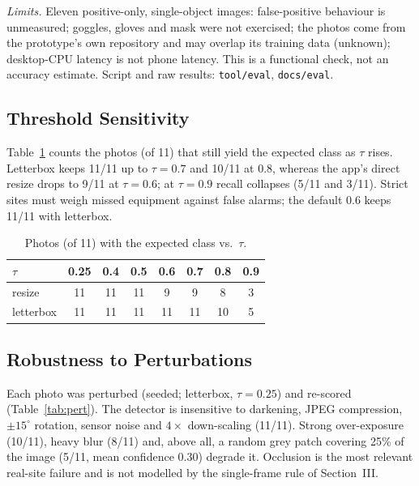 \documentclass[conference]{IEEEtran}
\begin{document}
\emph{Limits.} Eleven positive-only, single-object images: false-positive
behaviour is unmeasured; goggles, gloves and mask were not exercised; the photos
come from the prototype's own repository and may overlap its training data
(unknown); desktop-CPU latency is not phone latency. This is a functional check,
not an accuracy estimate. Script and raw results: \texttt{tool/eval},
\texttt{docs/eval}.

\subsection{Threshold Sensitivity}
Table~\ref{tab:tau} counts the photos (of 11) that still yield the expected class
as $\tau$ rises. Letterbox keeps 11/11 up to $\tau=0.7$ and 10/11 at 0.8, whereas
the app's direct resize drops to 9/11 at $\tau=0.6$; at $\tau=0.9$ recall
collapses (5/11 and 3/11). Strict sites must weigh missed equipment against
false alarms; the default 0.6 keeps 11/11 with letterbox.

\begin{table}[t]
\caption{Photos (of 11) with the expected class vs.\ $\tau$.}
\label{tab:tau}
\centering\footnotesize
\begin{tabular}{l|ccccccc}
\toprule
$\tau$ & 0.25 & 0.4 & 0.5 & 0.6 & 0.7 & 0.8 & 0.9 \\
\midrule
resize & 11 & 11 & 11 & 9 & 9 & 8 & 3 \\
letterbox & 11 & 11 & 11 & 11 & 11 & 10 & 5 \\
\bottomrule
\end{tabular}
\end{table}

\subsection{Robustness to Perturbations}
Each photo was perturbed (seeded; letterbox, $\tau=0.25$) and re-scored
(Table~\ref{tab:pert}). The detector is insensitive to darkening, JPEG
compression, $\pm15^\circ$ rotation, sensor noise and $4\times$ down-scaling
(11/11). Strong over-exposure (10/11), heavy blur (8/11) and, above all, a random
grey patch covering 25\% of the image (5/11, mean confidence 0.30) degrade it.
Occlusion is the most relevant real-site failure and is not modelled by the
single-frame rule of Section~III.
\end{document}
